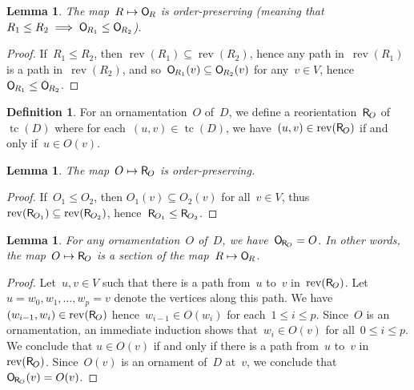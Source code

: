 \documentclass{amsart}
\newtheorem{lemma}[theorem]{Lemma}
\theoremstyle{definition}
\newtheorem{definition}[theorem]{Definition}
\DeclareMathOperator{\tc}{tc} %
\newcommand{\Vincent}[1]{\todo[size=\tiny,color=blue!30]{ #1 \\ \hfill --- V.}\,}
\newcommand{\mymap}[2]{\mathsf{#1}_{\hspace{-.7pt}#2}}
\newcommand{\orn}[1]{\mymap{O}{#1}}  %
\newcommand{\reori}[1]{\mymap{R}{#1}}  %
\DeclareMathOperator{\rev}{rev} %
\begin{document}
\begin{lemma}
\label{lem:Reori2Orn2}
The map~$R \mapsto \orn{R}$ is order-preserving (meaning that~$R_1 \le R_2 \implies \orn{R_1} \le \orn{R_2}$).
\end{lemma}

\begin{proof}
If~$R_1 \le R_2$, then $\rev(R_1) \subseteq \rev(R_2)$, hence any path in~$\rev(R_1)$ is a path in~$\rev(R_2)$, and so~$\orn{R_1}(v) \subseteq \orn{R_2}(v)$ for any~$v \in V$, hence~$\orn{R_1} \le \orn{R_2}$.
\end{proof}

\begin{definition}
\label{def:Orn2Reori}
For an ornamentation~$O$ of~$D$, we define a reorientation~$\reori{O}$ of~$\tc(D)$ where for each~$(u,v) \in \tc(D)$, we have~$(u,v) \in \rev(\reori{O})$ if and only if~$u \in O(v)$.
\end{definition}

\begin{lemma}
\label{lem:Orn2Reori1}
The map~$O \mapsto \reori{O}$ is order-preserving.
\end{lemma}

\begin{proof}
If~$O_1 \le O_2$, then $O_1(v) \subseteq O_2(v)$ for all~$v \in V$, thus~$\rev(\reori{O_1}) \subseteq \rev(\reori{O_2})$, hence~${\reori{O_1} \le \reori{O_2}}$.
\end{proof}

\begin{lemma}
\label{lem:Orn2Reori2}
For any ornamentation~$O$ of~$D$, we have~$\orn{\reori{O}} = O$. In other words, the map~${O \mapsto \reori{O}}$ is a section of the map~$R \mapsto \orn{R}$.
\end{lemma}

\begin{proof}
Let~$u,v \in V$ such that there is a path from~$u$ to~$v$ in~$\rev(\reori{O})$.
Let~$u = w_0, w_1, \dots, w_p = v$ denote the vertices along this path.
We have~$(w_{i-1},w_i) \in \rev(\reori{O})$ hence~$w_{i-1} \in O(w_i)$ for each~$1 \le i \le p$.
Since~$O$ is an ornamentation, an immediate induction shows that~$w_i \in O(v)$ for all~$0 \le i \le p$.
We conclude that $u \in O(v)$ if and only if there is a path from~$u$ to~$v$ in~$\rev(\reori{O})$.
Since~$O(v)$ is an ornament of~$D$ at~$v$, we conclude that~$\orn{\reori{O}}(v) = O(v)$.
\end{proof}
\end{document}

